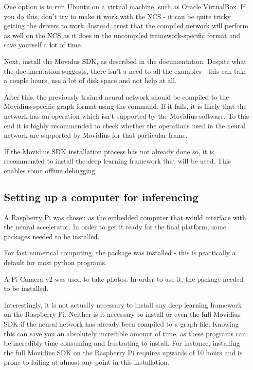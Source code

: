 One option is to run Ubuntu on a virtual machine, such as Oracle VirtualBox. If you do this, don't try to make it work with the NCS - it can be quite tricky getting the drivers to work. Instead, trust that the compiled network will perform as well on the NCS as it does in the uncompiled framework-specific format and save yourself a lot of time.

Next, install the Movidus SDK, as described in the documentation. Despite what the documentation suggests, there isn't a need to  all the examples - this can take a couple hours, use a lot of disk space and not help at all.

After this, the previously trained neural network should be compiled to the Movidius-specific graph format using the  command. If it fails, it is likely that the network has an operation which isn't supported by the Movidius software. To this end it is highly recommended to check whether the operations used in the neural network are supported by Movidius for that particular frame.%

If the Movidius SDK installation process has not already done so, it is recommended to install the deep learning framework that will be used. This enables some offline debugging.


\subsection{Setting up a computer for inferencing}
A Raspberry Pi was chosen as the embedded computer that would interface with the neural accelerator. In order to get it ready for the final platform, some packages needed to be installed.

For fast numerical computing, the  package was installed - this is practically a default for most python programs.

A Pi Camera v2 was used to take photos. In order to use it, the  package needed to be installed.

Interestingly, it is not actually necessary to install any deep learning framework on the Raspberry Pi. Neither is it necessary to install  or even the full Movidius SDK if the neural network has already been compiled to a graph file. Knowing this can save you an absolutely incredible amount of time, as these programs can be incredibly time consuming and frustrating to install. For instance, installing the full Movidius SDK on the Raspberry Pi requires upwards of 10 hours and is prone to failing at almost any point in this installation.

